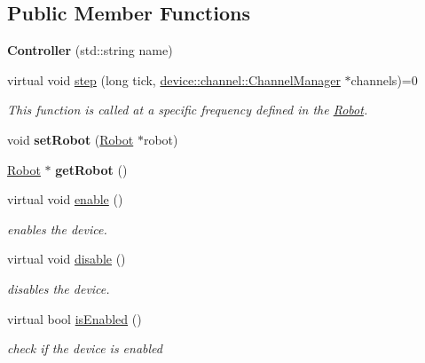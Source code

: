 \subsection*{Public Member Functions}
\begin{DoxyCompactItemize}
\item 
\hypertarget{classdrobot_1_1robot_1_1Controller_af74be803a0338e75a68c59f444530948}{{\bfseries Controller} (std\-::string name)}\label{classdrobot_1_1robot_1_1Controller_af74be803a0338e75a68c59f444530948}

\item 
virtual void \hyperlink{classdrobot_1_1robot_1_1Controller_acbbde3e529dad162fb36074c7e25a924}{step} (long tick, \hyperlink{classdrobot_1_1device_1_1channel_1_1ChannelManager}{device\-::channel\-::\-Channel\-Manager} $\ast$channels)=0
\begin{DoxyCompactList}\small\item\em This function is called at a specific frequency defined in the \hyperlink{classdrobot_1_1robot_1_1Robot}{Robot}. \end{DoxyCompactList}\item 
\hypertarget{classdrobot_1_1robot_1_1Controller_afa7f38adf10288f9942e133cfdf26f3e}{void {\bfseries set\-Robot} (\hyperlink{classdrobot_1_1robot_1_1Robot}{Robot} $\ast$robot)}\label{classdrobot_1_1robot_1_1Controller_afa7f38adf10288f9942e133cfdf26f3e}

\item 
\hypertarget{classdrobot_1_1robot_1_1Controller_aaee713e766a87dec33c48308be4a5102}{\hyperlink{classdrobot_1_1robot_1_1Robot}{Robot} $\ast$ {\bfseries get\-Robot} ()}\label{classdrobot_1_1robot_1_1Controller_aaee713e766a87dec33c48308be4a5102}

\item 
virtual void \hyperlink{classdrobot_1_1robot_1_1Controller_a533a9761503d502c64c25538ce8eb35c}{enable} ()
\begin{DoxyCompactList}\small\item\em enables the device. \end{DoxyCompactList}\item 
virtual void \hyperlink{classdrobot_1_1robot_1_1Controller_a40384f970deab8157ada1ead78d8b383}{disable} ()
\begin{DoxyCompactList}\small\item\em disables the device. \end{DoxyCompactList}\item 
virtual bool \hyperlink{classdrobot_1_1robot_1_1Controller_a8f7c73ba2adb3f7c02ff97b5c9d94b12}{is\-Enabled} ()
\begin{DoxyCompactList}\small\item\em check if the device is enabled \end{DoxyCompactList}\end{DoxyCompactItemize}
